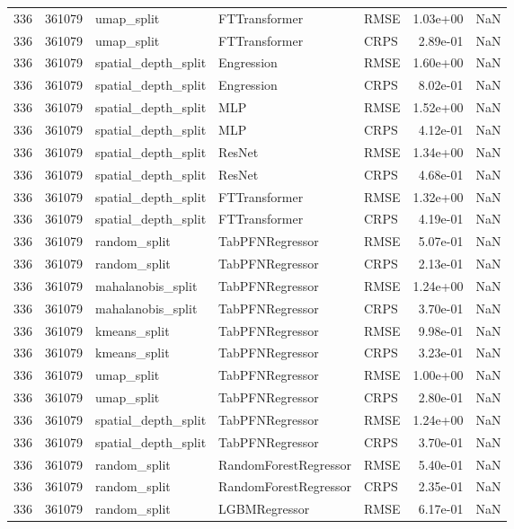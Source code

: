 \begin{tabular}{rrlllrr}
336 & 361079 & umap\_split & FTTransformer & RMSE & 1.03e+00 & NaN \\
336 & 361079 & umap\_split & FTTransformer & CRPS & 2.89e-01 & NaN \\
336 & 361079 & spatial\_depth\_split & Engression & RMSE & 1.60e+00 & NaN \\
336 & 361079 & spatial\_depth\_split & Engression & CRPS & 8.02e-01 & NaN \\
336 & 361079 & spatial\_depth\_split & MLP & RMSE & 1.52e+00 & NaN \\
336 & 361079 & spatial\_depth\_split & MLP & CRPS & 4.12e-01 & NaN \\
336 & 361079 & spatial\_depth\_split & ResNet & RMSE & 1.34e+00 & NaN \\
336 & 361079 & spatial\_depth\_split & ResNet & CRPS & 4.68e-01 & NaN \\
336 & 361079 & spatial\_depth\_split & FTTransformer & RMSE & 1.32e+00 & NaN \\
336 & 361079 & spatial\_depth\_split & FTTransformer & CRPS & 4.19e-01 & NaN \\
336 & 361079 & random\_split & TabPFNRegressor & RMSE & 5.07e-01 & NaN \\
336 & 361079 & random\_split & TabPFNRegressor & CRPS & 2.13e-01 & NaN \\
336 & 361079 & mahalanobis\_split & TabPFNRegressor & RMSE & 1.24e+00 & NaN \\
336 & 361079 & mahalanobis\_split & TabPFNRegressor & CRPS & 3.70e-01 & NaN \\
336 & 361079 & kmeans\_split & TabPFNRegressor & RMSE & 9.98e-01 & NaN \\
336 & 361079 & kmeans\_split & TabPFNRegressor & CRPS & 3.23e-01 & NaN \\
336 & 361079 & umap\_split & TabPFNRegressor & RMSE & 1.00e+00 & NaN \\
336 & 361079 & umap\_split & TabPFNRegressor & CRPS & 2.80e-01 & NaN \\
336 & 361079 & spatial\_depth\_split & TabPFNRegressor & RMSE & 1.24e+00 & NaN \\
336 & 361079 & spatial\_depth\_split & TabPFNRegressor & CRPS & 3.70e-01 & NaN \\
336 & 361079 & random\_split & RandomForestRegressor & RMSE & 5.40e-01 & NaN \\
336 & 361079 & random\_split & RandomForestRegressor & CRPS & 2.35e-01 & NaN \\
336 & 361079 & random\_split & LGBMRegressor & RMSE & 6.17e-01 & NaN \\

\end{tabular}
